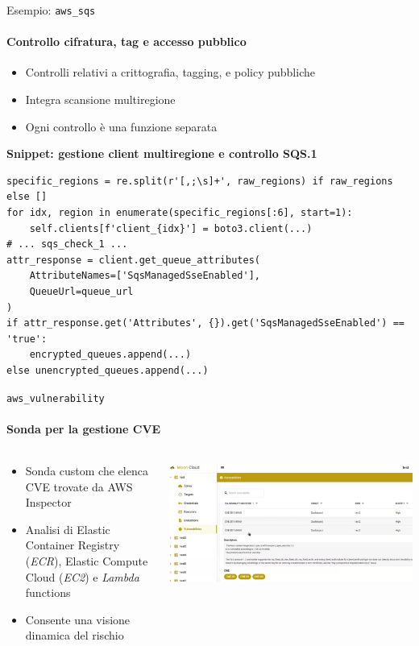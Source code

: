 \documentclass{beamer}
\begin{document}
\begin{frame}[fragile]{Esempio: \texttt{aws\_sqs}}
\framesubtitle{Controllo cifratura, tag e accesso pubblico}
\begin{itemize}
    \item Controlli relativi a crittografia, tagging, e policy pubbliche
    \item Integra scansione multiregione
    \item Ogni controllo è una funzione separata
\end{itemize}

\vspace{0.3cm}
\textbf{Snippet: gestione client multiregione e controllo SQS.1}
\begin{lstlisting}[style=statalepython, basicstyle=\scriptsize\ttfamily]
specific_regions = re.split(r'[,;\s]+', raw_regions) if raw_regions else []
for idx, region in enumerate(specific_regions[:6], start=1):
    self.clients[f'client_{idx}'] = boto3.client(...)
# ... sqs_check_1 ...
attr_response = client.get_queue_attributes(
    AttributeNames=['SqsManagedSseEnabled'],
    QueueUrl=queue_url
)
if attr_response.get('Attributes', {}).get('SqsManagedSseEnabled') == 'true':
    encrypted_queues.append(...)
else unencrypted_queues.append(...)
\end{lstlisting}
\end{frame}


\begin{frame}{\texttt{aws\_vulnerability}}
    \framesubtitle{Sonda per la gestione CVE}
    \begin{columns}
        \begin{column}{0.4\textwidth}
            \begin{itemize}
            \item Sonda custom che elenca CVE trovate da AWS Inspector
            \item Analisi di Elastic Container Registry (\emph{ECR}), 
                Elastic Compute Cloud (\emph{EC2}) e \emph{Lambda} functions
            \item Consente una visione dinamica del rischio
        \end{itemize}
        \end{column}
        \begin{column}{0.6\textwidth}
            \includegraphics[width=\textwidth]{assets/Screenshot 2025-07-08 at 10.56.53.png}
        \end{column}
    \end{columns}
\end{frame}
\end{document}
